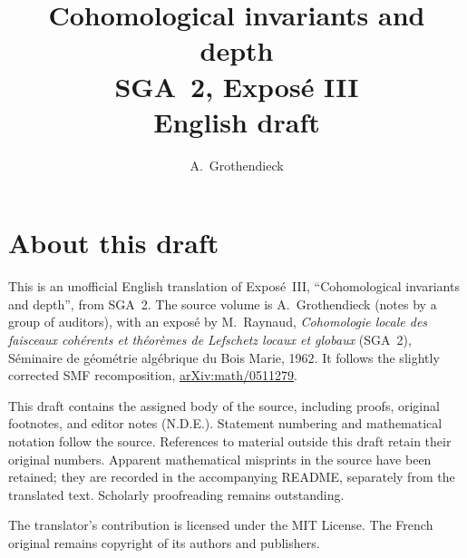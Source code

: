 \documentclass[11pt,a4paper,oneside]{amsbook}
\title[SGA~2, Exposé III (English draft)]{Cohomological invariants and depth\\
{\normalsize SGA~2, Exposé III\\English draft}}
\author{A.\ Grothendieck}
\date{}
\begin{document}
\frontmatter
\maketitle

\chapter*{About this draft}
This is an unofficial English translation of Expos\'e~III, ``Cohomological invariants and depth'',
from SGA~2. The source volume is A.\ Grothendieck
(notes by a group of auditors), with an expos\'e by M.\ Raynaud,
\textit{Cohomologie locale des faisceaux coh\'erents et th\'eor\`emes
de Lefschetz locaux et globaux} (SGA~2), S\'eminaire de g\'eom\'etrie
alg\'ebrique du Bois Marie, 1962. It follows the slightly corrected
SMF recomposition,
\href{https://arxiv.org/abs/math/0511279}{arXiv:math/0511279}.

This draft contains the assigned body of the source, including proofs,
original footnotes, and editor notes (N.D.E.). Statement numbering and
mathematical notation follow the source. References to material outside
this draft retain their original numbers. Apparent mathematical
misprints in the source have been retained; they are recorded in the
accompanying README, separately from the translated text. Scholarly
proofreading remains outstanding.

The translator's contribution is licensed under
the MIT License.
The French original remains copyright of its authors and publishers.

\tableofcontents
\mainmatter
\setcounter{chapter}{2}


\end{document}
